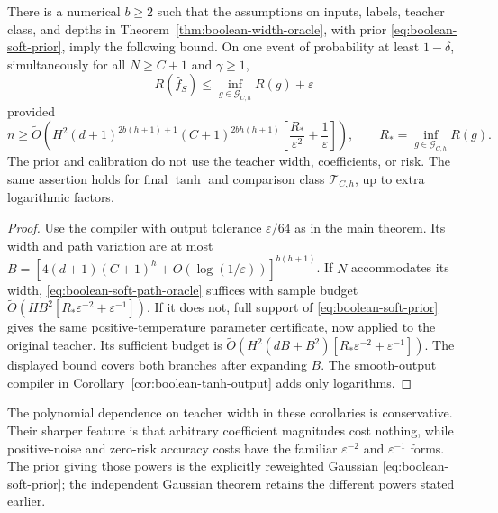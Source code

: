 \begin{corollary}
\label{cor:boolean-soft-width}
There is a numerical $b\ge2$ such that the assumptions on inputs, labels, teacher class, and depths in Theorem~\ref{thm:boolean-width-oracle}, with prior \eqref{eq:boolean-soft-prior}, imply the following bound. On one event of probability at least $1-\delta$, simultaneously for all $N\ge C+1$ and $\gamma\ge1$,
\[
 R(\widehat f_S)\le\inf_{g\in\mathcal G_{C,h}}R(g)+\varepsilon
\]
provided
\begin{equation}
 n\ge\widetilde O\left(
 H^2(d+1)^{2b(h+1)+1}(C+1)^{2bh(h+1)}
       \left[\frac{R_*}{\varepsilon^2}+\frac1\varepsilon\right]\right),
 \qquad R_*=\inf_{g\in\mathcal G_{C,h}}R(g).
 \label{eq:boolean-soft-samples}
\end{equation}
The prior and calibration do not use the teacher width, coefficients, or risk. The same assertion holds for final $\tanh$ and comparison class $\mathcal T_{C,h}$, up to extra logarithmic factors.
\end{corollary}
\begin{proof}
Use the compiler with output tolerance $\varepsilon/64$ as in the main theorem. Its width and path variation are at most
$B=[4(d+1)(C+1)^h+O(\log(1/\varepsilon))]^{b(h+1)}$.
If $N$ accommodates its width, \eqref{eq:boolean-soft-path-oracle} suffices with sample budget
$\widetilde O(HB^2[R_*\varepsilon^{-2}+\varepsilon^{-1}])$.
If it does not, full support of \eqref{eq:boolean-soft-prior} gives the same positive-temperature parameter certificate, now applied to the original teacher. Its sufficient budget is
$\widetilde O(H^2(dB+B^2)[R_*\varepsilon^{-2}+\varepsilon^{-1}])$.
The displayed bound covers both branches after expanding $B$. The smooth-output compiler in Corollary~\ref{cor:boolean-tanh-output} adds only logarithms.
\end{proof}

The polynomial dependence on teacher width in these corollaries is conservative. Their sharper feature is that arbitrary coefficient magnitudes cost nothing, while positive-noise and zero-risk accuracy costs have the familiar $\varepsilon^{-2}$ and $\varepsilon^{-1}$ forms. The prior giving those powers is the explicitly reweighted Gaussian \eqref{eq:boolean-soft-prior}; the independent Gaussian theorem retains the different powers stated earlier.
